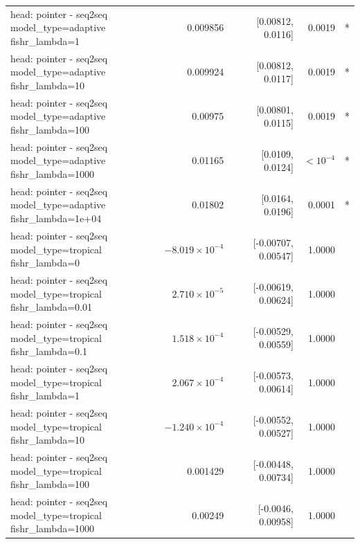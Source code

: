 \documentclass[10pt]{article}
\makeatletter
\newcommand{\stackcell}[1]{\begin{tabular}[t]{@{}l@{}}#1\end{tabular}}
\makeatother
\begin{document}
{\begin{longtable}{lrrrl}
\stackcell{head: pointer - seq2seq\\\footnotesize model\_type=adaptive fishr\_lambda=1 } & 0.009856 & [0.00812, 0.0116] & 0.0019 & *\\
\stackcell{head: pointer - seq2seq\\\footnotesize model\_type=adaptive fishr\_lambda=10 } & 0.009924 & [0.00812, 0.0117] & 0.0019 & *\\
\stackcell{head: pointer - seq2seq\\\footnotesize model\_type=adaptive fishr\_lambda=100 } & 0.00975 & [0.00801, 0.0115] & 0.0019 & *\\
\stackcell{head: pointer - seq2seq\\\footnotesize model\_type=adaptive fishr\_lambda=1000 } & 0.01165 & [0.0109, 0.0124] & $<10^{-4}$ & *\\
\stackcell{head: pointer - seq2seq\\\footnotesize model\_type=adaptive fishr\_lambda=1e+04 } & 0.01802 & [0.0164, 0.0196] & 0.0001 & *\\
\stackcell{head: pointer - seq2seq\\\footnotesize model\_type=tropical fishr\_lambda=0 } & $-8.019\times10^{-4}$ & [-0.00707, 0.00547] & 1.0000 & \\
\stackcell{head: pointer - seq2seq\\\footnotesize model\_type=tropical fishr\_lambda=0.01 } & $2.710\times10^{-5}$ & [-0.00619, 0.00624] & 1.0000 & \\
\stackcell{head: pointer - seq2seq\\\footnotesize model\_type=tropical fishr\_lambda=0.1 } & $1.518\times10^{-4}$ & [-0.00529, 0.00559] & 1.0000 & \\
\stackcell{head: pointer - seq2seq\\\footnotesize model\_type=tropical fishr\_lambda=1 } & $2.067\times10^{-4}$ & [-0.00573, 0.00614] & 1.0000 & \\
\stackcell{head: pointer - seq2seq\\\footnotesize model\_type=tropical fishr\_lambda=10 } & $-1.240\times10^{-4}$ & [-0.00552, 0.00527] & 1.0000 & \\
\stackcell{head: pointer - seq2seq\\\footnotesize model\_type=tropical fishr\_lambda=100 } & 0.001429 & [-0.00448, 0.00734] & 1.0000 & \\
\stackcell{head: pointer - seq2seq\\\footnotesize model\_type=tropical fishr\_lambda=1000 } & 0.00249 & [-0.0046, 0.00958] & 1.0000 & \\

\end{longtable}}
\end{document}
